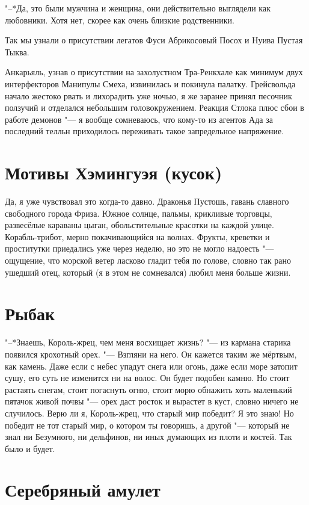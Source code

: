 \documentclass[a4paper,10pt,fleqn]{book}
\begin{document}
"--*Да, это были мужчина и женщина, они действительно выглядели как любовники.
Хотя нет, скорее как очень близкие родственники.

Так мы узнали о присутствии легатов Фуси Абрикосовый Посох и Нуива Пустая Тыква.

Анкарьяль, узнав о присутствии на захолустном Тра-Ренкхале как минимум двух интерфекторов Манипулы Смеха, извинилась и покинула палатку.
Грейсвольда начало жестоко рвать и лихорадить уже ночью, я же заранее принял песочник ползучий и отделался небольшим головокружением.
Реакция Стлока плюс сбои в работе демонов "--- я вообще сомневаюсь, что кому-то из агентов Ада за последний телльн приходилось переживать такое запредельное напряжение.

\section{Мотивы Хэмингуэя (кусок)}

Да, я уже чувствовал это когда-то давно.
Драконья Пустошь, гавань славного свободного города Фриза.
Южное солнце, пальмы, крикливые торговцы, развесёлые караваны цыган, обольстительные красотки на каждой улице.
Корабль-трибот, мерно покачивающийся на волнах.
Фрукты, креветки и проститутки приедались уже через неделю, но это не могло надоесть "--- ощущение, что морской ветер ласково гладит тебя по голове, словно так рано ушедший отец, который (я в этом не сомневался) любил меня больше жизни.

\section{Рыбак}

"--*Знаешь, Король-жрец, чем меня восхищает жизнь? "--- из кармана старика появился крохотный орех.
"--- Взгляни на него.
Он кажется таким же мёртвым, как камень.
Даже если с небес упадут снега или огонь, даже если море затопит сушу, его суть не изменится ни на волос.
Он будет подобен камню.
Но стоит растаять снегам, стоит погаснуть огню, стоит морю обнажить хоть маленький пятачок живой почвы "--- орех даст росток и вырастет в куст, словно ничего не случилось.
Верю ли я, Король-жрец, что старый мир победит?
Я это знаю!
Но победит не тот старый мир, о котором ты говоришь, а другой "--- который не знал ни Безумного, ни дельфинов, ни иных думающих из плоти и костей.
Так было и будет.

\section{Серебряный амулет}
\end{document}
